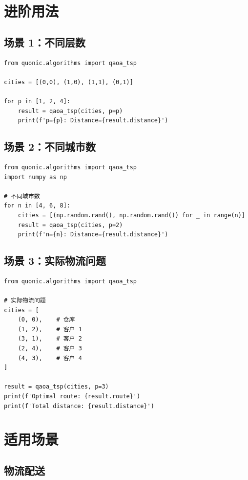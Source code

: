 \documentclass[12pt,a4paper]{article}
\begin{document}
\section{进阶用法}

\subsection{场景 1：不同层数}

\begin{verbatim}
from quonic.algorithms import qaoa_tsp

cities = [(0,0), (1,0), (1,1), (0,1)]

for p in [1, 2, 4]:
    result = qaoa_tsp(cities, p=p)
    print(f'p={p}: Distance={result.distance}')
\end{verbatim}

\subsection{场景 2：不同城市数}

\begin{verbatim}
from quonic.algorithms import qaoa_tsp
import numpy as np

# 不同城市数
for n in [4, 6, 8]:
    cities = [(np.random.rand(), np.random.rand()) for _ in range(n)]
    result = qaoa_tsp(cities, p=2)
    print(f'n={n}: Distance={result.distance}')
\end{verbatim}

\subsection{场景 3：实际物流问题}

\begin{verbatim}
from quonic.algorithms import qaoa_tsp

# 实际物流问题
cities = [
    (0, 0),    # 仓库
    (1, 2),    # 客户 1
    (3, 1),    # 客户 2
    (2, 4),    # 客户 3
    (4, 3),    # 客户 4
]

result = qaoa_tsp(cities, p=3)
print(f'Optimal route: {result.route}')
print(f'Total distance: {result.distance}')
\end{verbatim}

\section{适用场景}

\subsection{物流配送}
\end{document}
